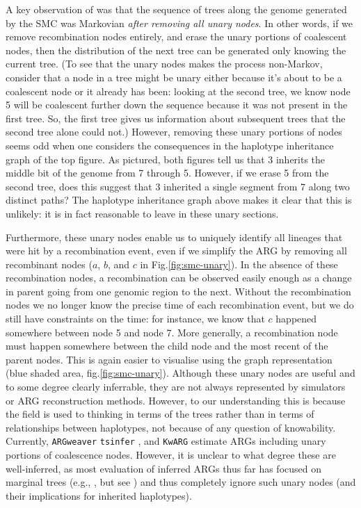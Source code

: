\documentclass{article}
\newcommand{\tsinfer}[0]{\texttt{tsinfer}}
\newcommand{\kwarg}[0]{\texttt{KwARG}}
\newcommand{\argweaver}[0]{\texttt{ARGweaver}}
\begin{document}
A key observation of \citet{mcvean_approximating_2005}
was that the sequence of trees along the genome
generated by the SMC was Markovian \emph{after removing all unary nodes}.
In other words, if we remove recombination nodes entirely,
and erase the unary portions of coalescent nodes,
then the distribution of the next tree can be generated only knowing the current tree.
(To see that the unary nodes makes the process non-Markov,
consider that a node in a tree might be unary either because it's about to be a coalescent node
or it already has been:
looking at the second tree, we know node 5 will be coalescent further down the sequence
because it was not present in the first tree.
So, the first tree gives us information about subsequent trees
that the second tree alone could not.)
However, removing these unary portions of nodes seems odd
when one considers the consequences in the haplotype inheritance graph
of the top figure.
As pictured, both figures tell us that
3 inherits the middle bit of the genome from 7 through 5.
However, if we erase 5 from the second tree,
does this suggest that 3 inherited a single segment from 7 along two distinct paths?
The haplotype inheritance graph above makes it clear that this is unlikely:
it is in fact reasonable to leave in these unary sections.

Furthermore, these unary nodes enable
us to uniquely identify all lineages that were hit by a recombination event,
even if we simplify the ARG by removing all recombinant nodes
($a$, $b$, and $c$ in Fig.\ref{fig:smc-unary}).
In the absence of these recombination nodes, a recombination can be observed
easily enough as a change in parent going from one genomic region to the next.
Without the recombination nodes we no longer know the precise time of each recombination event,
but we do still have constraints on the time:
for instance, we know that $c$ happened somewhere between node 5 and node 7.
More generally, a recombination node must happen somewhere between the child node
and the most recent of the parent nodes.
This is again easier to visualise using the
graph representation (blue shaded area, fig.\ref{fig:smc-unary}).
Although these unary nodes are useful and to some degree clearly inferrable,
they are not always represented by simulators or ARG reconstruction methods.
However, to our understanding this is because
the field is used to thinking in terms of the trees
rather than in terms of relationships between haplotypes,
not because of any question of knowability.
Currently,
\argweaver{} \citep{rasmussen_genome-wide_2014}
\tsinfer{} \citep{kelleher_inferring_2019}, and
\kwarg{} \citep{ignatieva_kwarg_2021}
estimate ARGs including unary portions of coalescence nodes.
However, it is unclear to what degree these are well-inferred,
as most evaluation of inferred ARGs thus far has focused on marginal trees
(e.g., \citet{brandt2022evaluation,kelleher_inferring_2019},
but see \citet{deng2021distribution})
and thus completely ignore such unary nodes
(and their implications for inherited haplotypes).
\end{document}
